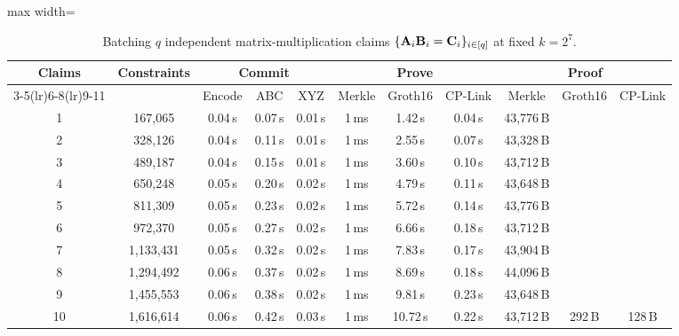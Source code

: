 \begin{table}[!t]
\centering
  \ifshowrevisions
  \fi
\setlength{\tabcolsep}{2.4pt}
\begin{adjustbox}{max width=\textwidth}
\begin{tabular}{c c ccc ccc ccc}
\toprule
\multirow{2}{*}{\textbf{Claims}}
& \multirow{2}{*}{\textbf{Constraints}}
& \multicolumn{3}{c}{\textbf{Commit}}
& \multicolumn{3}{c}{\textbf{Prove}}
& \multicolumn{3}{c}{\textbf{Proof}} \\
\cmidrule(lr){3-5}\cmidrule(lr){6-8}\cmidrule(lr){9-11}
& & Encode & ABC & XYZ
& Merkle & Groth16 & CP-Link
& Merkle & Groth16 & CP-Link \\
\midrule
1  & 167{,}065   & 0.04\,s & 0.07\,s & 0.01\,s & 1\,ms & 1.42\,s  & 0.04\,s & 43{,}776\,B & & \\
2  & 328{,}126   & 0.04\,s & 0.11\,s & 0.01\,s & 1\,ms & 2.55\,s  & 0.07\,s & 43{,}328\,B & & \\
3  & 489{,}187   & 0.04\,s & 0.15\,s & 0.01\,s & 1\,ms & 3.60\,s  & 0.10\,s & 43{,}712\,B & & \\
4  & 650{,}248   & 0.05\,s & 0.20\,s & 0.02\,s & 1\,ms & 4.79\,s  & 0.11\,s & 43{,}648\,B & & \\
5  & 811{,}309   & 0.05\,s & 0.23\,s & 0.02\,s & 1\,ms & 5.72\,s  & 0.14\,s & 43{,}776\,B & & \\
6  & 972{,}370   & 0.05\,s & 0.27\,s & 0.02\,s & 1\,ms & 6.66\,s  & 0.18\,s & 43{,}712\,B & & \\
7  & 1{,}133{,}431 & 0.05\,s & 0.32\,s & 0.02\,s & 1\,ms & 7.83\,s  & 0.17\,s & 43{,}904\,B & & \\
8  & 1{,}294{,}492 & 0.06\,s & 0.37\,s & 0.02\,s & 1\,ms & 8.69\,s  & 0.18\,s & 44{,}096\,B & & \\
9  & 1{,}455{,}553 & 0.06\,s & 0.38\,s & 0.02\,s & 1\,ms & 9.81\,s  & 0.23\,s & 43{,}648\,B & & \\
10 & 1{,}616{,}614 & 0.06\,s & 0.42\,s & 0.03\,s & 1\,ms & 10.72\,s & 0.22\,s & 43{,}712\,B & \multirow{-10}{*}{292\,B} & \multirow{-10}{*}{128\,B} \\
\bottomrule
\end{tabular}
\end{adjustbox}
\vspace{6pt}
\caption{Batching \(q\) independent matrix-multiplication claims
\(\{\mathbf{A}_i\mathbf{B}_i=\mathbf{C}_i\}_{i\in[q]}\) at fixed \(k=2^7\).}
\label{tab:lamp-batch}
\end{table}

